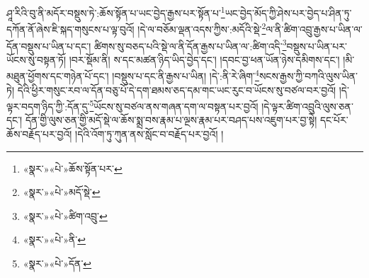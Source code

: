 ཤཱ་རིའི་བུ་ནི་མདོར་བསྡུས་ཏེ་:ཆོས་སྟོན་པ་ཡང་བྱེད་རྒྱས་པར་སྟོན་པ་\footnote{«སྣར་»«པེ་»ཆོས་སྟོན་པར་}ཡང་བྱེད་མོད་ཀྱི་ཤེས་པར་བྱེད་པ་ཤིན་ཏུ་དཀོན་ནོ་ཞེས་ཇི་སྐད་གསུངས་པ་ལྟ་བུའོ། །དེ་ལ་བཅོམ་ལྡན་འདས་ཀྱིས་:མདོའི་སྡེ་\footnote{«སྣར་»«པེ་»མདོ་སྡེ་}ལ་ནི་ཚིག་འབྲུ་རྒྱས་པ་ཡིན་ལ་དོན་བསྡུས་པ་ཡིན་པ་དང་། ཚིགས་སུ་བཅད་པའི་སྡེ་ལ་ནི་དོན་རྒྱས་པ་ཡིན་ལ་:ཚིག་འདི་\footnote{«སྣར་»«པེ་»ཚིག་འབྲུ་}བསྡུས་པ་ཡིན་པར་ཡོངས་སུ་བསྟན་ཏོ། །བར་སྡོམ་ནི། ས་དང་མཚན་ཉིད་ཡིད་བྱེད་དང་། །དབང་བྱ་ཕན་ཡོན་ཉེས་དམིགས་དང་། །མི་མཐུན་ཕྱོགས་དང་གཉེན་པོ་དང་། །བསྡུས་པ་དང་ནི་རྒྱས་པ་ཡིན། །དེ་:ནི་རེ་ཞིག་\footnote{«སྣར་»«པེ་»ནི་}སངས་རྒྱས་ཀྱི་བཀའི་ལུས་ཡིན་ཏེ། དེའི་ཕྱིར་གསུང་རབ་ལ་དོན་བཅུ་པོ་དེ་དག་ཐམས་ཅད་དམ་གང་ཡང་རུང་བ་ཡོངས་སུ་བཙལ་བར་བྱའོ། །དེ་ལྟར་བདག་ཉིད་ཀྱི་:དོན་དུ་\footnote{«སྣར་»«པེ་»དོན་}ཡོངས་སུ་བཙལ་ནས་གཞན་དག་ལ་བསྟན་པར་བྱའོ། །དེ་ལྟར་ཚིག་འབྲུའི་ལུས་ཅན་དང་། དོན་གྱི་ལུས་ཅན་གྱི་མདོ་སྡེ་ལ་ཆོས་སྨྲ་བས་རྣམ་པ་ལྔས་རྣམ་པར་བཤད་པས་འཇུག་པར་བྱ་སྟེ། དང་པོར་ཆོས་བརྗོད་པར་བྱའོ། །དེའི་འོག་ཏུ་ཀུན་ནས་སློང་བ་བརྗོད་པར་བྱའོ། །
